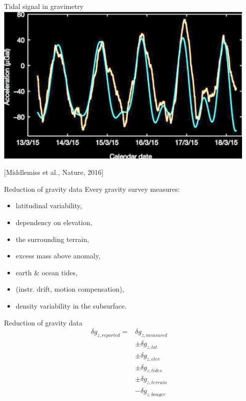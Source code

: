\begin{frame}
  \begin{PointSix}{Tidal signal in gravimetry}
    \includegraphics[width=0.95\textwidth]{Figures/Gravity/Exported/TidalEffects_MiddlemissNature2016.png}

    \tiny [Middlemiss et al., Nature, 2016]
  \end{PointSix}
\end{frame}


\begin{frame}
  \begin{PointSix}{Reduction of gravity data}
    Every gravity survey measures:
    \begin{itemize}
      \item \textcolor{MyBlue}{latitudinal variability},
      \item \textcolor{MyBlue}{dependency on elevation},
      \item \textcolor{MyBlue}{the surrounding terrain},
      \item \textcolor{MyBlue}{excess mass above anomaly},
      \item \textcolor{MyBlue}{earth \& ocean tides},
      \item (instr. drift, motion compensation),
      \item \alert{density variability in the subsurface.}
    \end{itemize}
  \end{PointSix}
\end{frame}

\begin{frame}
  \begin{PointSix}{Reduction of gravity data}
    \begin{align*}
        \delta g_{z, reported} = &\delta g_{z, measured} \\
        &\pm \delta g_{z, lat}   \\
        &\pm \delta g_{z, elev}  \\
        &\pm \delta g_{z, tides}  \\
        &\pm \delta g_{z,terrain} \\ 
        &- \delta g_{z,bouger}  
  \end{align*}
  \end{PointSix}
\end{frame}


